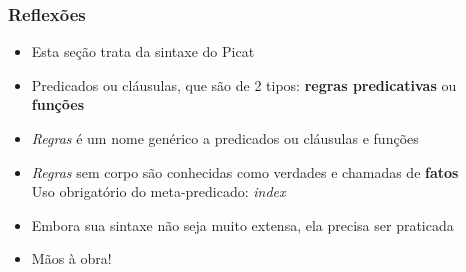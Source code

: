 

\begin{frame}[fragile]
\frametitle{Reflexões}

\begin{itemize}

  \item Esta seção  trata da sintaxe do Picat
 
 \pause 
  \item Predicados ou cláusulas, que são
  de 2 tipos: \textbf{regras predicativas} ou \textbf{funções}


    \pause
  \item \textit{Regras} é um nome genérico a predicados ou cláusulas e funções
  
  
    \pause
  \item \textit{Regras} sem corpo são conhecidas como verdades e chamadas de \textbf{fatos}\\
Uso obrigatório do meta-predicado:  \textit{index}
  
   \pause
  \item Embora sua sintaxe não seja muito extensa, ela precisa 
  ser praticada
  
   \pause
  \item Mãos à obra!
\end{itemize}

\end{frame}
